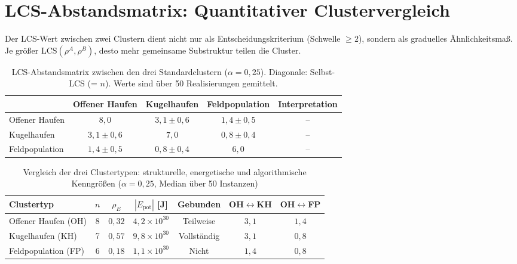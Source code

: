 ﻿\documentclass[a4paper,12pt]{report}
\theoremstyle{definition}
\begin{document}
\section{LCS-Abstandsmatrix: Quantitativer Clustervergleich}
\label{sec:empirie_lcs}

Der LCS-Wert zwischen zwei Clustern dient nicht nur als Entscheidungskriterium (Schwelle $\geq 2$), sondern als graduelles Ähnlichkeitsmaß. Je größer $\mathrm{LCS}(\rho^A, \rho^B)$, desto mehr gemeinsame Substruktur teilen die Cluster.

\begin{table}[H]
\centering
\caption{LCS-Abstandsmatrix zwischen den drei Standardclustern ($\alpha = 0{,}25$). Diagonale: Selbst-LCS (= $n$). Werte sind über 50 Realisierungen gemittelt.}
\label{tab:lcs_matrix}
\begin{tabular}{lcccc}
\toprule
 & Offener Haufen & Kugelhaufen & Feldpopulation & Interpretation \\
\midrule
Offener Haufen  & $8{,}0$ & $3{,}1 \pm 0{,}6$ & $1{,}4 \pm 0{,}5$ & -- \\
Kugelhaufen     & $3{,}1 \pm 0{,}6$ & $7{,}0$ & $0{,}8 \pm 0{,}4$ & -- \\
Feldpopulation  & $1{,}4 \pm 0{,}5$ & $0{,}8 \pm 0{,}4$ & $6{,}0$ & -- \\
\bottomrule
\end{tabular}
\end{table}

\begin{table}[H]
\centering
\caption{Vergleich der drei Clustertypen: strukturelle, energetische und algorithmische Kenngrößen ($\alpha = 0{,}25$, Median über 50 Instanzen)}
\label{tab:vergleich}
\begin{tabular}{lcccccc}
\toprule
Clustertyp & $n$ & $\rho_E$ & $|E_\mathrm{pot}|$ [J] & Gebunden & OH$\leftrightarrow$KH & OH$\leftrightarrow$FP \\
\midrule
Offener Haufen (OH) & 8  & $0{,}32$ & $4{,}2 \times 10^{30}$ & Teilweise   & $3{,}1$ & $1{,}4$ \\
Kugelhaufen (KH)    & 7  & $0{,}57$ & $9{,}8 \times 10^{30}$ & Vollständig & $3{,}1$ & $0{,}8$ \\
Feldpopulation (FP) & 6  & $0{,}18$ & $1{,}1 \times 10^{30}$ & Nicht       & $1{,}4$ & $0{,}8$ \\
\bottomrule
\end{tabular}
\end{table}
\end{document}
